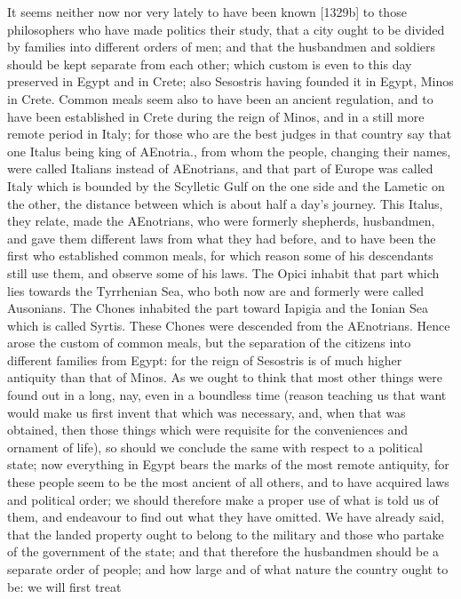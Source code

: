 It seems neither now nor very lately to have been known [1329b] to those
philosophers who have made politics their study, that a city ought to be
divided by families into different orders of men; and that the husbandmen
and soldiers should be kept separate from each other; which custom is even
to this day preserved in Egypt and in Crete; also Sesostris having founded
it in Egypt, Minos in Crete. Common meals seem also to have been an
ancient regulation, and to have been established in Crete during the reign
of Minos, and in a still more remote period in Italy; for those who are
the best judges in that country say that one Italus being king of
AEnotria., from whom the people, changing their names, were called
Italians instead of AEnotrians, and that part of Europe was called Italy
which is bounded by the Scylletic Gulf on the one side and the Lametic on
the other, the distance between which is about half a day's journey. This
Italus, they relate, made the AEnotrians, who were formerly shepherds,
husbandmen, and gave them different laws from what they had before, and to
have been the first who established common meals, for which reason some of
his descendants still use them, and observe some of his laws. The Opici
inhabit that part which lies towards the Tyrrhenian Sea, who both now are
and formerly were called Ausonians. The Chones inhabited the part toward
Iapigia and the Ionian Sea which is called Syrtis. These Chones were
descended from the AEnotrians. Hence arose the custom of common meals, but
the separation of the citizens into different families from Egypt: for the
reign of Sesostris is of much higher antiquity than that of Minos. As we
ought to think that most other things were found out in a long, nay, even
in a boundless time (reason teaching us that want would make us first
invent that which was necessary, and, when that was obtained, then those
things which were requisite for the conveniences and ornament of life), so
should we conclude the same with respect to a political state; now
everything in Egypt bears the marks of the most remote antiquity, for
these people seem to be the most ancient of all others, and to have
acquired laws and political order; we should therefore make a proper use
of what is told us of them, and endeavour to find out what they have
omitted. We have already said, that the landed property ought to belong to
the military and those who partake of the government of the state; and
that therefore the husbandmen should be a separate order of people; and
how large and of what nature the country ought to be: we will first treat
